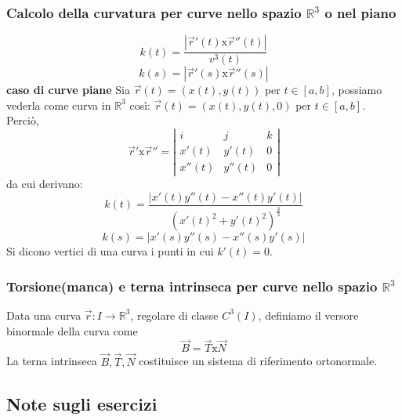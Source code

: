 \subsubsection{Calcolo della curvatura per curve nello spazio $\mathbb{R}^3$ o nel piano}
\[
    k(t) = \frac{|\vec{r}'(t) \text{x} \vec{r}''(t)|}{v^3(t)}
\]
\[
    k(s) = |\vec{r}'(s) \text{x} \vec{r}''(s)|
\]
\newline
\textbf{caso di curve piane}\newline
Sia $\vec{r}(t) =(x(t), y(t))$ per $t \in[a,b]$, possiamo vederla come curva in $\mathbb{R}^3$ così: $\vec{r}(t) = (x(t), y(t), 0)$ per $t \in[a,b]$.\newline
Perciò,
\[
    \vec{r}' \text{x} \vec{r}'' =\left|\begin{matrix}
        i \;\;& j \;\;& k \\
        x'(t) & y'(t) & 0\\
        x''(t) & y''(t) & 0
    \end{matrix} \right|
\]
da cui derivano:
\[
    k(t) = \frac{|x'(t)y''(t) - x''(t) y'(t)|}{(x'(t)^2 + y'(t)^2)^{\frac{3}{3}}}
\]
\[
    k(s) = |x'(s) y''(s) - x''(s) y'(s)|
\]
\newline
\newline
Si dicono vertici di una curva i punti in cui $k'(t) = 0$.
\subsubsection{Torsione(manca) e terna intrinseca per curve nello spazio $\mathbb{R}^3$}
Data una curva $\vec{r} : I \rightarrow \mathbb{R}^3$, regolare di classe $C^3(I)$, definiamo il versore binormale della curva come
\[
    \vec{B} = \vec{T} \text{x} \vec{N}
\]
La terna intrinseca $\vec{B}, \vec{T}, \vec{N}$ costituisce un sistema di riferimento ortonormale.
\subsection{Note sugli esercizi}
